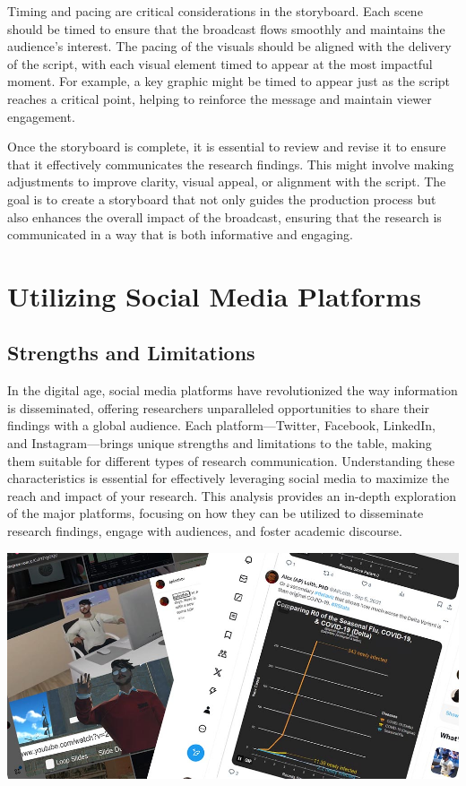 \documentclass[
]{book}
\begin{document}
Timing and pacing are critical considerations in the storyboard. Each scene should be timed to ensure that the broadcast flows smoothly and maintains the audience's interest. The pacing of the visuals should be aligned with the delivery of the script, with each visual element timed to appear at the most impactful moment. For example, a key graphic might be timed to appear just as the script reaches a critical point, helping to reinforce the message and maintain viewer engagement.

Once the storyboard is complete, it is essential to review and revise it to ensure that it effectively communicates the research findings. This might involve making adjustments to improve clarity, visual appeal, or alignment with the script. The goal is to create a storyboard that not only guides the production process but also enhances the overall impact of the broadcast, ensuring that the research is communicated in a way that is both informative and engaging.

\section{Utilizing Social Media Platforms}\label{utilizing-social-media-platforms}

\subsection*{Strengths and Limitations}\label{strengths-and-limitations}

In the digital age, social media platforms have revolutionized the way information is disseminated, offering researchers unparalleled opportunities to share their findings with a global audience. Each platform---Twitter, Facebook, LinkedIn, and Instagram---brings unique strengths and limitations to the table, making them suitable for different types of research communication. Understanding these characteristics is essential for effectively leveraging social media to maximize the reach and impact of your research. This analysis provides an in-depth exploration of the major platforms, focusing on how they can be utilized to disseminate research findings, engage with audiences, and foster academic discourse.

\includegraphics[width=1\textwidth,height=\textheight]{images/fig092.jpg}
\end{document}
